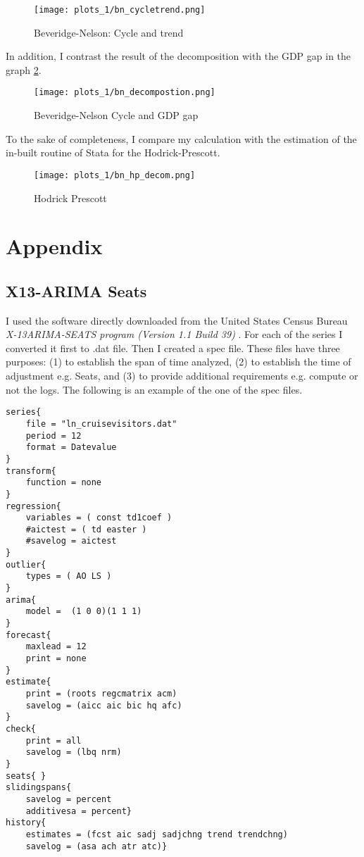 \documentclass[11pt]{article}
\begin{document}
\begin{figure}[H]
    \centering
     \texttt{[image: plots\_1/bn\_cycletrend.png]}
     \caption{Beveridge-Nelson: Cycle and trend}
    \label{fig:bntrend}
\end{figure}

In addition, I contrast the result of the decomposition with the GDP gap in the graph \ref{fig:bndecomp}.

\begin{figure}[H]
    \centering
     \texttt{[image: plots\_1/bn\_decompostion.png]}
     \caption{Beveridge-Nelson Cycle and  GDP gap}
    \label{fig:bndecomp}
\end{figure}

To the sake of completeness, I compare my calculation with the estimation of the in-built routine of Stata for the Hodrick-Prescott.

\begin{figure}[H]
    \centering
     \texttt{[image: plots\_1/bn\_hp\_decom.png]}
     \caption{Hodrick Prescott}
    \label{fig:bndecomps}
\end{figure}



\newpage

\section{Appendix}
\subsection{X13-ARIMA Seats}
I used the software directly downloaded from the United States Census Bureau \textit{X-13ARIMA-SEATS program (Version 1.1 Build 39) }. For each of the series I converted it first to .dat file. Then I created a spec file. These files have three purposes: (1) to establish the span of time analyzed, (2) to establish the time of adjustment e.g. Seats, and (3) to provide additional requirements e.g. compute or not the logs. The following is an example of the one of the spec files.
\begin{verbatim}
series{ 
    file = "ln_cruisevisitors.dat"
    period = 12
    format = Datevalue
}
transform{ 
    function = none
}
regression{ 
    variables = ( const td1coef )
    #aictest = ( td easter )
    #savelog = aictest
}
outlier{ 
    types = ( AO LS )
}
arima{ 
    model =  (1 0 0)(1 1 1)
}
forecast{ 
    maxlead = 12
    print = none
}
estimate{ 
    print = (roots regcmatrix acm)
    savelog = (aicc aic bic hq afc)
}
check{ 
    print = all
    savelog = (lbq nrm)
}
seats{ }
slidingspans{ 
    savelog = percent
    additivesa = percent}
history{ 
    estimates = (fcst aic sadj sadjchng trend trendchng)
    savelog = (asa ach atr atc)}
\end{verbatim}
\end{document}
